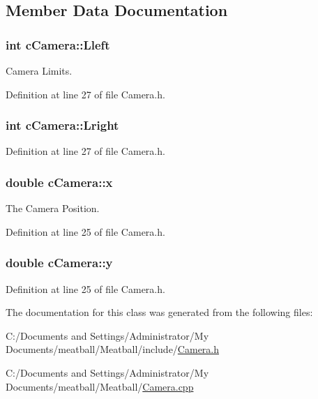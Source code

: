 \subsection{Member Data Documentation}
\hypertarget{classc_camera_a809224c5974f73a689db51e49bc1afd3}{
\subsubsection[{Lleft}]{\setlength{\rightskip}{0pt plus 5cm}int c\-Camera\-::\-Lleft}}\label{classc_camera_a809224c5974f73a689db51e49bc1afd3}


Camera Limits. 



Definition at line 27 of file Camera.\-h.

\hypertarget{classc_camera_ab4c7149b1d6b3f011d8bf8b47a2e05ca}{
\subsubsection[{Lright}]{\setlength{\rightskip}{0pt plus 5cm}int c\-Camera\-::\-Lright}}\label{classc_camera_ab4c7149b1d6b3f011d8bf8b47a2e05ca}


Definition at line 27 of file Camera.\-h.

\hypertarget{classc_camera_a8d1c4c332fe0231e63d5da1567b56ea6}{
\subsubsection[{x}]{\setlength{\rightskip}{0pt plus 5cm}double c\-Camera\-::x}}\label{classc_camera_a8d1c4c332fe0231e63d5da1567b56ea6}


The Camera Position. 



Definition at line 25 of file Camera.\-h.

\hypertarget{classc_camera_ad49020fabd1bdac433d9a92d2b6b96b2}{
\subsubsection[{y}]{\setlength{\rightskip}{0pt plus 5cm}double c\-Camera\-::y}}\label{classc_camera_ad49020fabd1bdac433d9a92d2b6b96b2}


Definition at line 25 of file Camera.\-h.



The documentation for this class was generated from the following files\-:\begin{DoxyCompactItemize}
\item 
C\-:/\-Documents and Settings/\-Administrator/\-My Documents/meatball/\-Meatball/include/\hyperlink{_camera_8h}{Camera.\-h}\item 
C\-:/\-Documents and Settings/\-Administrator/\-My Documents/meatball/\-Meatball/\hyperlink{_camera_8cpp}{Camera.\-cpp}\end{DoxyCompactItemize}
